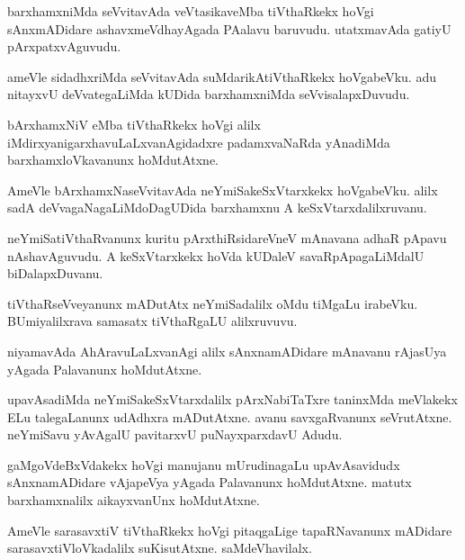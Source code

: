 \documentclass{article}
\begin{document}
\begin{mn}
barxhamxniMda seVvitavAda veVtasikaveMba tiVthaRkekx hoVgi sAnxmADidare ashavxmeVdhayAgada PAalavu 
baruvudu. utatxmavAda gatiyU pArxpatxvAguvudu.
\end{mn}

\begin{mn}
ameVle sidadhxriMda seVvitavAda suMdarikAtiVthaRkekx hoVgabeVku. adu nitayxvU deVvategaLiMda 
kUDida barxhamxniMda  seVvisalapxDuvudu.
\end{mn}

\begin{mn}
bArxhamxNiV eMba tiVthaRkekx hoVgi alilx iMdirxyanigarxhavuLaLxvanAgidadxre padamxvaNaRda 
yAnadiMda barxhamxloVkavanunx hoMdutAtxne.
\end{mn}

\begin{mn}
AmeVle bArxhamxNaseVvitavAda neYmiSakeSxVtarxkekx hoVgabeVku. alilx sadA deVvagaNagaLiMdoDagUDida
barxhamxnu A keSxVtarxdalilxruvanu. 
\end{mn}

\begin{mn}
neYmiSatiVthaRvanunx kuritu pArxthiRsidareVneV mAnavana adhaR pApavu nAshavAguvudu. A 
keSxVtarxkekx hoVda kUDaleV savaRpApagaLiMdalU biDalapxDuvanu.
\end{mn}

\begin{mn}
tiVthaRseVveyanunx mADutAtx neYmiSadalilx oMdu tiMgaLu irabeVku. BUmiyalilxrava samasatx tiVthaRgaLU
alilxruvuvu.
\end{mn}

\begin{mn}
niyamavAda AhAravuLaLxvanAgi alilx sAnxnamADidare mAnavanu rAjasUya yAgada Palavanunx hoMdutAtxne.
\end{mn}


\begin{mn}
upavAsadiMda neYmiSakeSxVtarxdalilx pArxNabiTaTxre taninxMda meVlakekx ELu talegaLanunx udAdhxra
mADutAtxne. avanu savxgaRvanunx seVrutAtxne. neYmiSavu yAvAgalU  pavitarxvU puNayxparxdavU Adudu.
\end{mn}

\begin{mn}
gaMgoVdeBxVdakekx hoVgi manujanu mUrudinagaLu upAvAsavidudx sAnxnamADidare vAjapeVya yAgada 
Palavanunx hoMdutAtxne. matutx barxhamxnalilx aikayxvanUnx hoMdutAtxne.
\end{mn}

\begin{mn}
AmeVle sarasavxtiV tiVthaRkekx hoVgi pitaqgaLige tapaRNavanunx mADidare sarasavxtiVloVkadalilx 
suKisutAtxne. saMdeVhavilalx.
\end{mn}
\end{document}
